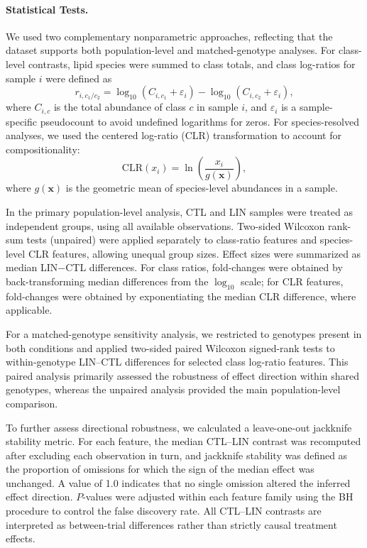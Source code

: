 \documentclass[9pt,twocolumn,twoside]{rilabRxiv}
\begin{document}
\paragraph{Statistical Tests.}
We used two complementary nonparametric approaches, reflecting that the dataset supports both population-level and matched-genotype analyses. For class-level contrasts, lipid species were summed to class totals, and class log-ratios for sample \(i\) were defined as
\[
r_{i,c_1/c_2}=\log_{10}(C_{i,c_1}+\varepsilon_i)-\log_{10}(C_{i,c_2}+\varepsilon_i),
\]
where \(C_{i,c}\) is the total abundance of class \(c\) in sample \(i\), and \(\varepsilon_i\) is a sample-specific pseudocount to avoid undefined logarithms for zeros. For species-resolved analyses, we used the centered log-ratio (CLR) transformation to account for compositionality:
\[
\mathrm{CLR}(x_i)=\ln\!\left(\frac{x_i}{g(\mathbf{x})}\right),
\]
where \(g(\mathbf{x})\) is the geometric mean of species-level abundances in a sample.

In the primary population-level analysis, CTL and LIN samples were treated as independent groups, using all available observations. Two-sided Wilcoxon rank-sum tests (unpaired) were applied separately to class-ratio features and species-level CLR features, allowing unequal group sizes. Effect sizes were summarized as median LIN\(-\)CTL differences. For class ratios, fold-changes were obtained by back-transforming median differences from the \(\log_{10}\) scale; for CLR features, fold-changes were obtained by exponentiating the median CLR difference, where applicable.

For a matched-genotype sensitivity analysis, we restricted to genotypes present in both conditions and applied two-sided paired Wilcoxon signed-rank tests to within-genotype LIN--CTL differences for selected class log-ratio features. This paired analysis primarily assessed the robustness of effect direction within shared genotypes, whereas the unpaired analysis provided the main population-level comparison.

To further assess directional robustness, we calculated a leave-one-out jackknife stability metric. For each feature, the median CTL--LIN contrast was recomputed after excluding each observation in turn, and jackknife stability was defined as the proportion of omissions for which the sign of the median effect was unchanged. A value of 1.0 indicates that no single omission altered the inferred effect direction. \(P\)-values were adjusted within each feature family using the BH procedure to control the false discovery rate. All CTL--LIN contrasts are interpreted as between-trial differences rather than strictly causal treatment effects.
\end{document}
